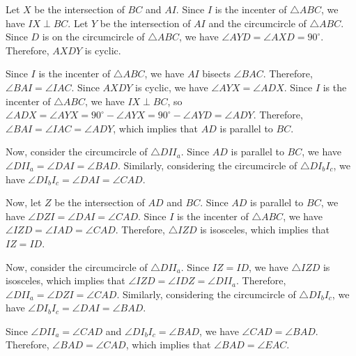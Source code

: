 Let $X$ be the intersection of $BC$ and $AI$. Since $I$ is the incenter of $\triangle ABC$, we have $IX \perp BC$. Let $Y$ be the intersection of $AI$ and the circumcircle of $\triangle ABC$. Since $D$ is on the circumcircle of $\triangle ABC$, we have $\angle AYD = \angle AXD = 90^\circ$. Therefore, $AXDY$ is cyclic.

Since $I$ is the incenter of $\triangle ABC$, we have $AI$ bisects $\angle BAC$. Therefore, $\angle BAI = \angle IAC$. Since $AXDY$ is cyclic, we have $\angle AYX = \angle ADX$. Since $I$ is the incenter of $\triangle ABC$, we have $IX \perp BC$, so $\angle ADX = \angle AYX = 90^\circ - \angle AYX = 90^\circ - \angle AYD = \angle ADY$. Therefore, $\angle BAI = \angle IAC = \angle ADY$, which implies that $AD$ is parallel to $BC$.

Now, consider the circumcircle of $\triangle DII_a$. Since $AD$ is parallel to $BC$, we have $\angle DII_a = \angle DAI = \angle BAD$. Similarly, considering the circumcircle of $\triangle DI_bI_c$, we have $\angle DI_bI_c = \angle DAI = \angle CAD$.

Now, let $Z$ be the intersection of $AD$ and $BC$. Since $AD$ is parallel to $BC$, we have $\angle DZI = \angle DAI = \angle CAD$. Since $I$ is the incenter of $\triangle ABC$, we have $\angle IZD = \angle IAD = \angle CAD$. Therefore, $\triangle IZD$ is isosceles, which implies that $IZ = ID$.

Now, consider the circumcircle of $\triangle DII_a$. Since $IZ = ID$, we have $\triangle IZD$ is isosceles, which implies that $\angle IZD = \angle IDZ = \angle DII_a$. Therefore, $\angle DII_a = \angle DZI = \angle CAD$. Similarly, considering the circumcircle of $\triangle DI_bI_c$, we have $\angle DI_bI_c = \angle DAI = \angle BAD$.

Since $\angle DII_a = \angle CAD$ and $\angle DI_bI_c = \angle BAD$, we have $\angle CAD = \angle BAD$. Therefore, $\angle BAD = \angle CAD$, which implies that $\angle BAD = \angle EAC$.
